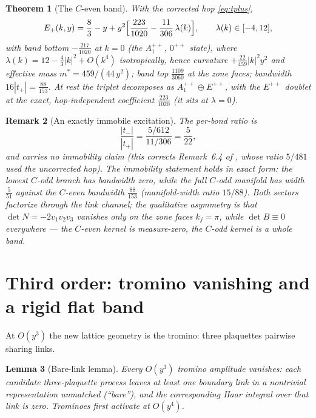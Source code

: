 \documentclass[11pt]{article}
\newtheorem{theorem}{Theorem}[section]
\newtheorem{lemma}[theorem]{Lemma}
\newtheorem{remark}[theorem]{Remark}
\begin{document}
\begin{theorem}[The $C$-even band]\label{thm:ceven}
With the corrected hop \eqref{eq:tplus},
\begin{equation}
E_+(k,y)=\frac83-y+y^2\Bigl[\frac{223}{1020}-\frac{11}{306}\,\lambda(k)\Bigr],
\qquad \lambda(k)\in[-4,12],
\end{equation}
with band bottom $-\tfrac{217}{1020}$ at $k=0$ (the $A_1^{++}$, $0^{++}$
state), where $\lambda(k)=12-\tfrac43|k|^2+O(k^4)$ isotropically, hence
curvature $+\tfrac{22}{459}|k|^2y^2$ and effective mass $m^*=459/(44\,y^2)$;
band top $\tfrac{1109}{3060}$ at the zone faces; bandwidth
$16|t_+|=\tfrac{88}{153}$. At rest the triplet decomposes as
$A_1^{++}\oplus E^{++}$, with the $E^{++}$ doublet at the exact,
hop-independent coefficient $\tfrac{223}{1020}$ (it sits at $\lambda=0$).
\end{theorem}

\begin{remark}[An exactly immobile excitation]\label{rem:immobile}
The per-bond ratio is
\[
\frac{|t_-|}{|t_+|}=\frac{5/612}{11/306}=\frac5{22},
\]
and carries no immobility claim (this corrects Remark~6.4 of \cite{companion}, whose ratio
$5/481$ used the uncorrected hop). The immobility statement holds in exact
form: the lowest $C$-odd branch has bandwidth zero, while the full $C$-odd
manifold has width $\tfrac{5}{51}$ against the $C$-even bandwidth
$\tfrac{88}{153}$ (manifold-width ratio $15/88$). Both sectors factorize
through the link channel; the qualitative asymmetry is that
$\det N=-2v_1v_2v_3$ vanishes only on the zone faces $k_j=\pi$, while
$\det B\equiv0$ everywhere --- the $C$-even kernel is measure-zero, the
$C$-odd kernel is a whole band.
\end{remark}

\section{Third order: tromino vanishing and a rigid flat band}
\label{sec:thirdorder}

At $O(y^3)$ the new lattice geometry is the tromino: three plaquettes
pairwise sharing links.

\begin{lemma}[Bare-link lemma]\label{lem:barelink}
Every $O(y^3)$ tromino amplitude vanishes: each candidate three-plaquette
process leaves at least one boundary link in a nontrivial representation
unmatched (``bare''), and the corresponding Haar integral over that link is
zero. Trominoes first activate at $O(y^4)$.
\end{lemma}
\end{document}
